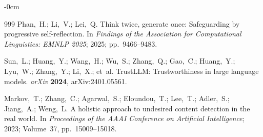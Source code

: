 \documentclass[Superintelligence,article,submit,pdftex,moreauthors]{Definitions/mdpi}
\begin{document}
\begin{adjustwidth}{-\extralength}{0cm}
{\begin{thebibliography}{999}
Phan,~H.; Li,~V.; Lei,~Q.
Think twice, generate once: Safeguarding by progressive self-reflection.
In {\em Findings of the Association for Computational Linguistics: EMNLP 2025}; 2025; pp.~9466--9483.

Sun,~L.; Huang,~Y.; Wang,~H.; Wu,~S.; Zhang,~Q.; Gao,~C.; Huang,~Y.; Lyu,~W.; Zhang,~Y.; Li,~X.; et~al.
{TrustLLM}: Trustworthiness in large language models.
{\em arXiv} {\bf 2024}, arXiv:2401.05561.

Markov,~T.; Zhang,~C.; Agarwal,~S.; Eloundou,~T.; Lee,~T.; Adler,~S.; Jiang,~A.; Weng,~L.
A holistic approach to undesired content detection in the real world.
In {\em Proceedings of the AAAI Conference on Artificial Intelligence}; 2023; Volume~37, pp.~15009--15018.

\end{thebibliography}
}

\PublishersNote{}
\end{adjustwidth}
\end{document}
